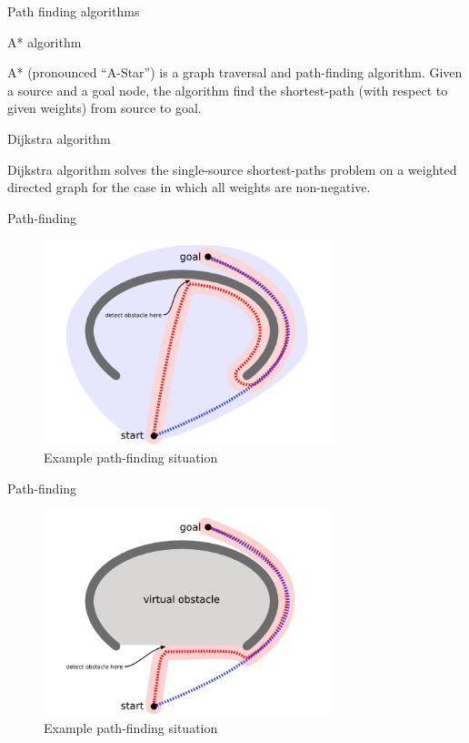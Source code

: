 \documentclass[ignorenonframetext,]{beamer}
\begin{document}
\begin{frame}{Path finding algorithms}
\protect\hypertarget{path-finding-algorithms}{}

\begin{block}{A* algorithm}

A* (pronounced ``A-Star'') is a graph traversal and path-finding
algorithm. Given a source and a goal node, the algorithm find the
shortest-path (with respect to given weights) from source to goal.

\end{block}

\begin{block}{Dijkstra algorithm}

Dijkstra algorithm solves the single-source shortest-paths problem on a
weighted directed graph for the case in which all weights are
non-negative.

\end{block}

\end{frame}

\begin{frame}{Path-finding}
\protect\hypertarget{path-finding}{}

\begin{figure}
\centering
\includegraphics[width=\textwidth,height=2.34375in]{concave1.png}
\caption{Example path-finding situation}
\end{figure}

\end{frame}

\begin{frame}{Path-finding}
\protect\hypertarget{path-finding-1}{}

\begin{figure}
\centering
\includegraphics[width=\textwidth,height=2.34375in]{concave2.png}
\caption{Example path-finding situation}
\end{figure}

\end{frame}
\end{document}
